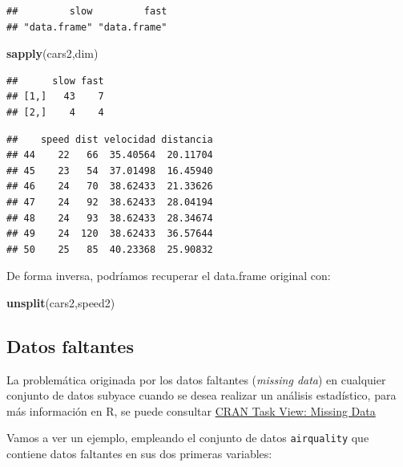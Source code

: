 \documentclass[
]{book}
\newenvironment{Shaded}{\begin{snugshade}}{\end{snugshade}}
\newcommand{\FunctionTok}[1]{\textcolor[rgb]{0.13,0.29,0.53}{\textbf{#1}}}
\newcommand{\NormalTok}[1]{#1}
\newcommand{\SpecialCharTok}[1]{\textcolor[rgb]{0.81,0.36,0.00}{\textbf{#1}}}
\theoremstyle{break}
\theoremstyle{nonumberplain}
\begin{document}
\begin{verbatim}
##         slow         fast 
## "data.frame" "data.frame"
\end{verbatim}

\begin{Shaded}
\begin{Highlighting}[]
\FunctionTok{sapply}\NormalTok{(cars2,dim)}
\end{Highlighting}
\end{Shaded}

\begin{verbatim}
##      slow fast
## [1,]   43    7
## [2,]    4    4
\end{verbatim}

\begin{Shaded}
\end{Shaded}

\begin{verbatim}
##    speed dist velocidad distancia
## 44    22   66  35.40564  20.11704
## 45    23   54  37.01498  16.45940
## 46    24   70  38.62433  21.33626
## 47    24   92  38.62433  28.04194
## 48    24   93  38.62433  28.34674
## 49    24  120  38.62433  36.57644
## 50    25   85  40.23368  25.90832
\end{verbatim}

De forma inversa, podríamos recuperar el data.frame original con:

\begin{Shaded}
\begin{Highlighting}[]
\FunctionTok{unsplit}\NormalTok{(cars2,speed2)}
\end{Highlighting}
\end{Shaded}

\subsection{Datos faltantes}\label{missing}

La problemática originada por los datos faltantes (\emph{missing data}) en cualquier conjunto de datos subyace cuando se desea
realizar un análisis estadístico, para más información en R, se puede consultar \href{https://cran.r-project.org/web/views/MissingData.html}{CRAN Task View: Missing Data}

Vamos a ver un ejemplo, empleando el conjunto de datos \texttt{airquality} que contiene datos faltantes en sus dos primeras variables:
\end{document}
